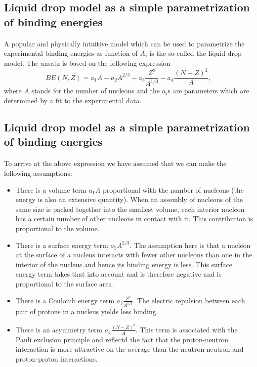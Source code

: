 \documentclass[%
twoside,                 %
final,                   %
10pt]{article}
\begin{document}
\subsection*{Liquid drop model as a simple parametrization of binding energies}

\paragraph{}

A popular and physically intuitive model which can be used to parametrize 
the experimental binding energies as function of $A$, is the so-called 
the liquid drop model. The ansatz is based on the following expression
\[ 
BE(N,Z) = a_1A-a_2A^{2/3}-a_3\frac{Z^2}{A^{1/3}}-a_4\frac{(N-Z)^2}{A},
\]
where $A$ stands for the number of nucleons and the $a_i$s are parameters which are determined by a fit 
to the experimental data.




\subsection*{Liquid drop model as a simple parametrization of binding energies}

\paragraph{}
To arrive at the above expression we have assumed that we can make the following assumptions:

\begin{itemize}
 \item There is a volume term $a_1A$ proportional with the number of nucleons (the energy is also an extensive quantity). When an assembly of nucleons of the same size is packed together into the smallest volume, each interior nucleon has a certain number of other nucleons in contact with it. This contribution is proportional to the volume.

 \item There is a surface energy term $a_2A^{2/3}$. The assumption here is that a nucleon at the surface of a nucleus interacts with fewer other nucleons than one in the interior of the nucleus and hence its binding energy is less. This surface energy term takes that into account and is therefore negative and is proportional to the surface area.

 \item There is a Coulomb energy term $a_3\frac{Z^2}{A^{1/3}}$. The electric repulsion between each pair of protons in a nucleus yields less binding. 

 \item There is an asymmetry term $a_4\frac{(N-Z)^2}{A}$. This term is associated with the Pauli exclusion principle and reflectd the fact that the proton-neutron interaction is more attractive on the average than the neutron-neutron and proton-proton interactions.
\end{itemize}
\end{document}
